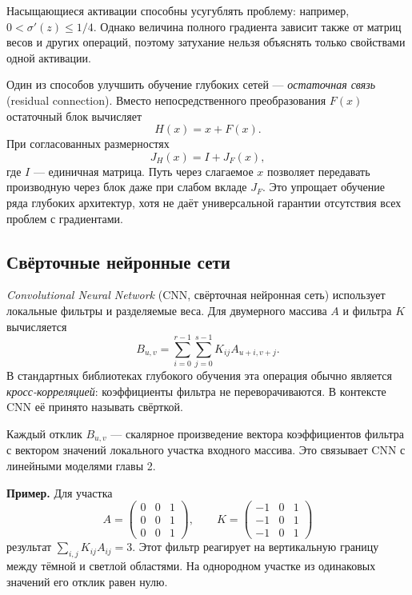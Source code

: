 \documentclass[12pt,a4paper]{article}
\begin{document}
Насыщающиеся активации способны усугублять проблему:
например, $0<\sigma'(z)\le1/4$. Однако величина полного
градиента зависит также от матриц весов и других операций,
поэтому затухание нельзя объяснять только свойствами
одной активации.

Один из способов улучшить обучение глубоких сетей ---
\emph{остаточная связь} (residual connection).
Вместо непосредственного преобразования $F(x)$
остаточный блок вычисляет
\begin{equation}
    H(x)=x+F(x).
    \label{eq:resnet}
\end{equation}
При согласованных размерностях
\[
    J_H(x)=I+J_F(x),
\]
где $I$ --- единичная матрица.
Путь через слагаемое $x$ позволяет передавать
производную через блок даже при слабом вкладе $J_F$.
Это упрощает обучение ряда глубоких архитектур,
хотя не даёт универсальной гарантии отсутствия
всех проблем с градиентами.

\subsection{Свёрточные нейронные сети}

\emph{Convolutional Neural Network} (CNN, свёрточная нейронная сеть)
использует локальные фильтры и разделяемые веса.
Для двумерного массива $A$ и фильтра $K$ вычисляется
\begin{equation}
    B_{u,v}=\sum_{i=0}^{r-1}\sum_{j=0}^{s-1}
      K_{ij}A_{u+i,v+j}.
    \label{eq:cnn-filter}
\end{equation}
В стандартных библиотеках глубокого обучения эта операция
обычно является \emph{кросс-корреляцией}: коэффициенты фильтра
не переворачиваются. В контексте CNN её принято
называть свёрткой.

Каждый отклик $B_{u,v}$ --- скалярное произведение
вектора коэффициентов фильтра с вектором значений
локального участка входного массива. Это связывает CNN
с линейными моделями главы 2.

\textbf{Пример.} Для участка
\[
    A=\begin{pmatrix}
       0&0&1\\0&0&1\\0&0&1
    \end{pmatrix},\qquad
    K=\begin{pmatrix}
       -1&0&1\\-1&0&1\\-1&0&1
    \end{pmatrix}
\]
результат $\sum_{i,j}K_{ij}A_{ij}=3$.
Этот фильтр реагирует на вертикальную границу
между тёмной и светлой областями.
На однородном участке из одинаковых значений его отклик равен нулю.
\end{document}
